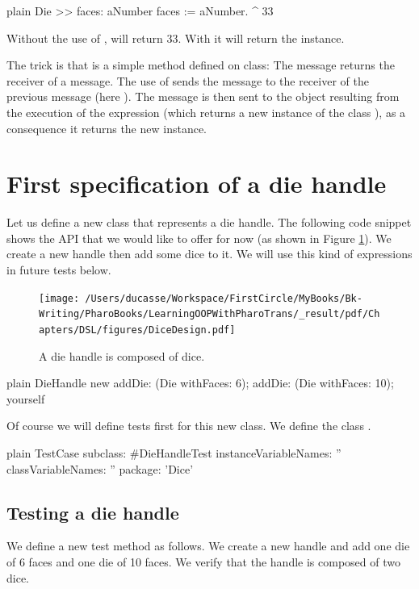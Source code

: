 \documentclass[10pt,twoside,english]{_support/latex/sbabook/sbabook}
\begin{document}
\begin{displaycode}{plain}
Die >> faces: aNumber 
	faces := aNumber. 
	^ 33
\end{displaycode}

Without the use of ,  will return 33. With  it will return the instance.

The trick is that  is a simple method defined on  class: The message  returns the receiver of a message.
The use of \textcode{;} sends the message to the receiver of the previous message (here ).  The message  is then sent to the object resulting from the execution of the expression  (which returns a new instance of the class ), as a consequence it returns the new instance. 
\section{First specification of a die handle}
Let us define a new class  that represents a die handle. 
The following code snippet shows the API that we would like to offer for now (as shown in Figure \ref{fig:DiceDesign}). We create a new handle then add some dice to it. We will use this kind of expressions in future tests below.


\begin{figure}

\begin{center}
\texttt{[image: /Users/ducasse/Workspace/FirstCircle/MyBooks/Bk-Writing/PharoBooks/LearningOOPWithPharoTrans/\_result/pdf/Chapters/DSL/figures/DiceDesign.pdf]}\caption{A die handle is composed of dice.\label{fig:DiceDesign}}\end{center}
\end{figure}


\begin{displaycode}{plain}
DieHandle new 
	addDie: (Die withFaces: 6);
	addDie: (Die withFaces: 10);
	yourself
\end{displaycode}

Of course we will define tests first for this new class. We define the class .

\begin{displaycode}{plain}
TestCase subclass: #DieHandleTest
	instanceVariableNames: ''
	classVariableNames: ''
	package: 'Dice'
\end{displaycode}
\subsection{Testing a die handle}
We define a new test method as follows. We create a new handle and add one die of 6 faces and one die of 10 faces.
We verify that the handle is composed of two dice. 
\end{document}
